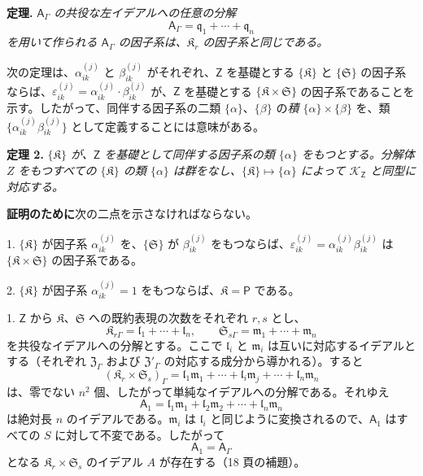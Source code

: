 \textbf{定理.} \emph{\(\mathsf{A}_\Gamma\) の共役な左イデアルへの任意の分解}
\[
\mathsf{A}_\Gamma=\mathfrak q_1+\cdots+\mathfrak q_n
\]
\emph{を用いて作られる \(\mathsf{A}_\Gamma\) の因子系は、\(\mathfrak K_r\) の因子系と同じである。}

次の定理は、\(\alpha_{ik}^{(j)}\) と \(\beta_{ik}^{(j)}\) がそれぞれ、\(\mathsf{Z}\) を基礎とする \(\{\mathfrak K\}\) と \(\{\mathfrak S\}\) の因子系ならば、\(\varepsilon_{ik}^{(j)}=\alpha_{ik}^{(j)}\cdot\beta_{ik}^{(j)}\) が、\(\mathsf{Z}\) を基礎とする \(\{\mathfrak K\times\mathfrak S\}\) の因子系であることを示す。したがって、同伴する因子系の二類 \(\{\alpha\}\)、\(\{\beta\}\) の\emph{積 \(\{\alpha\}\times\{\beta\}\)} を、類 \(\{\alpha_{ik}^{(j)}\beta_{ik}^{(j)}\}\) として定義することには意味がある。

\textbf{定理 2.} \emph{\(\{\mathfrak K\}\) が、\(\mathsf{Z}\) を基礎として同伴する因子系の類 \(\{\alpha\}\) をもつとする。分解体 \(Z\) をもつすべての \(\{\mathfrak K\}\) の類 \(\{\alpha\}\) は群をなし、\(\{\mathfrak K\}\mapsto\{\alpha\}\) によって \(\mathscr K_{\mathsf{Z}}\) と同型に対応する。}

\textbf{証明のために}次の二点を示さなければならない。

1. \(\{\mathfrak K\}\) が因子系 \(\alpha_{ik}^{(j)}\) を、\(\{\mathfrak S\}\) が \(\beta_{ik}^{(j)}\) をもつならば、\(\varepsilon_{ik}^{(j)}=\alpha_{ik}^{(j)}\beta_{ik}^{(j)}\) は \(\{\mathfrak K\times\mathfrak S\}\) の因子系である。

2. \(\{\mathfrak K\}\) が因子系 \(\alpha_{ik}^{(j)}=1\) をもつならば、\(\mathfrak K=\mathsf P\) である。

1. \(\mathsf{Z}\) から \(\mathfrak K\)、\(\mathfrak S\) への既約表現の次数をそれぞれ \(r,s\) とし、
\[
\mathfrak K_{r\Gamma}=\mathfrak l_1+\cdots+\mathfrak l_n,\qquad
\mathfrak S_{s\Gamma}=\mathfrak m_1+\cdots+\mathfrak m_n
\]
を共役なイデアルへの分解とする。ここで \(\mathfrak l_i\) と \(\mathfrak m_i\) は互いに対応するイデアルとする（それぞれ \(\mathfrak Z_\Gamma\) および \(\mathfrak Z'_\Gamma\) の対応する成分から導かれる）。すると
\[
(\mathfrak K_r\times\mathfrak S_s)_\Gamma
=\mathfrak l_1\mathfrak m_1+\cdots+\mathfrak l_i\mathfrak m_j+\cdots+\mathfrak l_n\mathfrak m_n
\]
は、零でない \(n^2\) 個、したがって単純なイデアルへの分解である。それゆえ
\[
\mathsf{A}_1=\mathfrak l_1\mathfrak m_1+\mathfrak l_2\mathfrak m_2+\cdots+\mathfrak l_n\mathfrak m_n
\]
は絶対長 \(n\) のイデアルである。\(\mathfrak m_i\) は \(\mathfrak l_i\) と同じように変換されるので、\(\mathsf{A}_1\) はすべての \(S\) に対して不変である。したがって
\[
\mathsf{A}_1=\mathsf{A}_\Gamma
\]
となる \(\mathfrak K_r\times\mathfrak S_s\) のイデアル \(A\) が存在する（18 頁の補題）。

